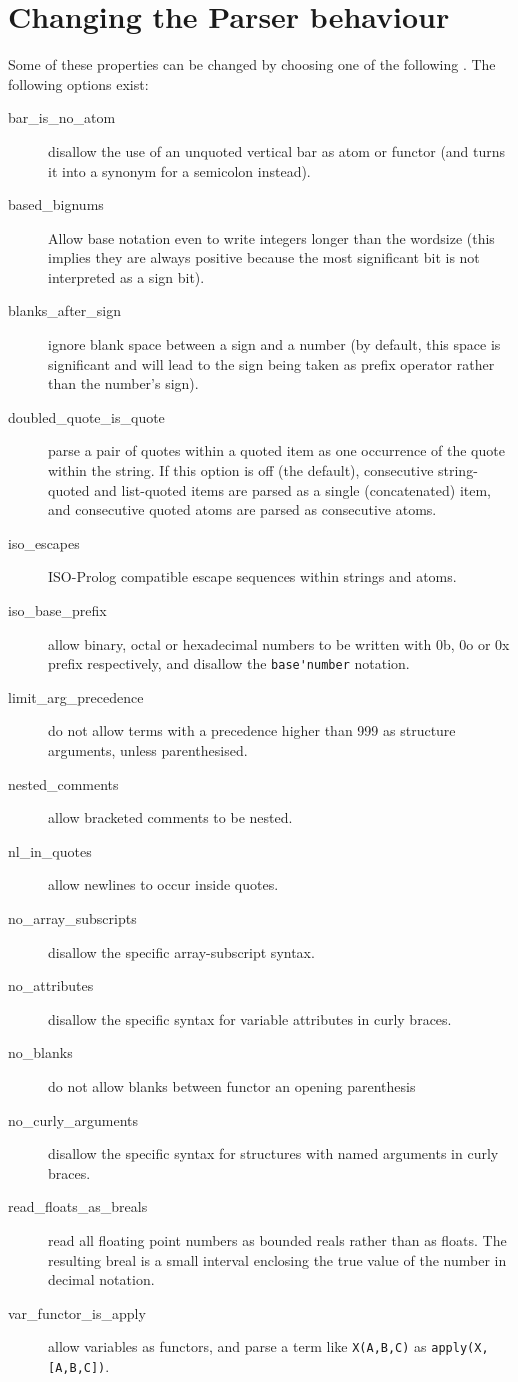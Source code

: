 \section{Changing the Parser behaviour}
Some of these properties can be changed by choosing one of the following
.
The following options exist:
\begin{description}
\item[bar_is_no_atom] disallow the use of an unquoted vertical bar as
    atom or functor (and turns it into a synonym for a semicolon instead).
\item[based_bignums] Allow base notation even to write integers longer
    than the wordsize (this implies they are always positive because the
    most significant bit is not interpreted as a sign bit).
\item[blanks_after_sign] ignore blank space between a sign and a number
    (by default, this space is significant and will lead to the sign
    being taken as prefix operator rather than the number's sign).
\item[doubled_quote_is_quote] parse a pair of quotes within a quoted item
    as one occurrence of the quote within the string. If this option is off
    (the default), consecutive string-quoted and list-quoted items are parsed
    as a single (concatenated) item, and consecutive quoted atoms are parsed
    as consecutive atoms.
\item[iso_escapes] ISO-Prolog compatible escape sequences within
    strings and atoms.
\item[iso_base_prefix] allow binary, octal or hexadecimal numbers to be written
    with 0b, 0o or 0x prefix respectively, and disallow the \verb+base'number+ notation.
\item[limit_arg_precedence]
    do not allow terms with a precedence higher than 999 as
    structure arguments, unless parenthesised.
\item[nested_comments] allow bracketed comments to be nested.
\item[nl_in_quotes] allow newlines to occur inside quotes.
\item[no_array_subscripts] disallow the {\eclipse} specific array-subscript
    syntax.
\item[no_attributes] disallow the {\eclipse} specific syntax for
    variable attributes in curly braces.
\item[no_blanks] do not allow blanks between functor an opening parenthesis
\item[no_curly_arguments] disallow the {\eclipse} specific syntax for
    structures with named arguments in curly braces.
\item[read_floats_as_breals] read all floating point numbers as bounded
    reals rather than as floats. The resulting breal is a small interval
    enclosing the true value of the number in decimal notation.
\item[var_functor_is_apply] allow variables as functors, and parse a term
    like \verb.X(A,B,C). as \verb.apply(X,[A,B,C])..
\end{description}
